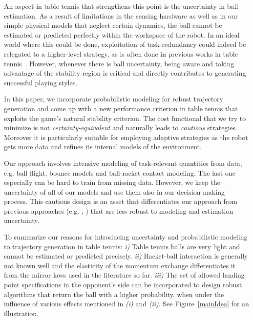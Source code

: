 \documentclass[letterpaper, 10 pt, conference]{ieeeconf}
\begin{document}
An aspect in table tennis that strengthens this point is the uncertainty in ball estimation. As a result of limitations in the sensing hardware as well as in our simple physical models that neglect certain dynamics, the ball cannot be estimated or predicted perfectly within the workspace of the robot. In an ideal world where this could be done, exploitation of task-redundancy could indeed be relegated to a higher-level strategy, as is often done in previous works in table tennis~\cite{Muelling13}. However, whenever there is ball uncertainty, being aware and taking advantage of the stability region is critical and directly contributes to generating successful playing styles.


In this paper, we incorporate probabilistic modeling for robust trajectory generation and come up with a new performance criterion in table tennis that exploits the game's natural stability criterion. The cost functional that we try to minimize is not \emph{certainty-equivalent} and naturally leads to \emph{cautious} strategies. Moreover it is particularly suitable for employing adaptive strategies as the robot gets more data and refines its internal models of the environment. 

Our approach involves intensive modeling of task-relevant quantities from data, e.g. ball flight, bounce models and ball-racket contact modeling. The last one especially can be hard to train from missing data. However, we keep the uncertainty of all of our models and use them also in our decision-making process. This cautious design is an asset that differentiates our approach from previous approaches (e.g. \cite{Matsushima05}, \cite{Muelling13}) that are less robust to modeling and estimation uncertainty.

To summarize our reasons for introducing uncertainty and probabilistic modeling to trajectory generation in table tennis: \textit{i)} Table tennis balls are very light and cannot be estimated or predicted precisely. \textit{ii)} Racket-ball interaction is generally not known well and the elasticity of the momentum exchange differentiates it from the mirror laws used in the literature so far. \textit{iii)} The set of allowed landing point specifications in the opponent's side can be incorporated to design robust algorithms that return the ball with a higher probability, when under the influence of various effects mentioned in \textit{(i)} and \textit{(ii)}. See Figure~\ref{mainIdea} for an illustration.%
\end{document}
